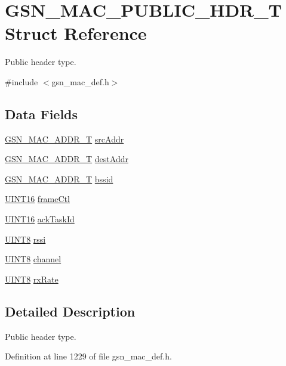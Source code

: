 \hypertarget{a00124}{
\section{GSN\_\-MAC\_\-PUBLIC\_\-HDR\_\-T Struct Reference}
\label{a00124}
}


Public header type.  




{\ttfamily \#include $<$gsn\_\-mac\_\-def.h$>$}

\subsection*{Data Fields}
\begin{DoxyCompactItemize}
\item 
\hyperlink{a00416}{GSN\_\-MAC\_\-ADDR\_\-T} \hyperlink{a00124_a256233a2b5125c28f7ee741edd0f37d0}{srcAddr}
\item 
\hyperlink{a00416}{GSN\_\-MAC\_\-ADDR\_\-T} \hyperlink{a00124_a3cae30f7120214990004e210534137a4}{destAddr}
\item 
\hyperlink{a00416}{GSN\_\-MAC\_\-ADDR\_\-T} \hyperlink{a00124_a0c8072b3bb52f68906a0aacd382de7c2}{bssid}
\item 
\hyperlink{a00660_ga09f1a1fb2293e33483cc8d44aefb1eb1}{UINT16} \hyperlink{a00124_a07e8719e40ad3ff98ea9b09cdf95af2a}{frameCtl}
\item 
\hyperlink{a00660_ga09f1a1fb2293e33483cc8d44aefb1eb1}{UINT16} \hyperlink{a00124_a3598d9e9ce94cff999cc297ce8c41a9c}{ackTaskId}
\item 
\hyperlink{a00660_gab27e9918b538ce9d8ca692479b375b6a}{UINT8} \hyperlink{a00124_ac219f836c66b6004ed87869ec52604f5}{rssi}
\item 
\hyperlink{a00660_gab27e9918b538ce9d8ca692479b375b6a}{UINT8} \hyperlink{a00124_a52d69a3bd7bdfdfc6f9e40f4962c575d}{channel}
\item 
\hyperlink{a00660_gab27e9918b538ce9d8ca692479b375b6a}{UINT8} \hyperlink{a00124_ac407ca9f2ce8b1dc4ee5c302e5b18c2b}{rxRate}
\end{DoxyCompactItemize}


\subsection{Detailed Description}
Public header type. 

Definition at line 1229 of file gsn\_\-mac\_\-def.h.



